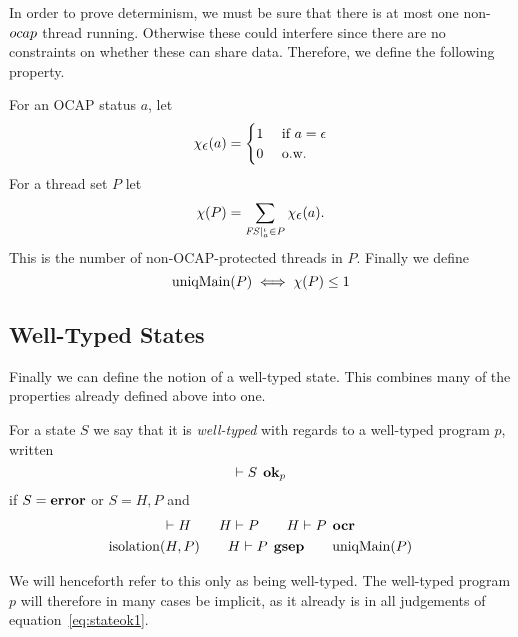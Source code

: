 In order to prove determinism, we must be sure that there is at most one
non-$\mbox{$ocap$}$ thread running. Otherwise these could interfere since there are no
constraints on whether these can share data. Therefore, we define the following
property.
\begin{definition}
  For an OCAP status $a$, let
  \begin{equation*}
    \chi_{\mbox{$\epsilon$}}(a) =
    \begin{cases}
      1 & \text{ if } a = \mbox{$\epsilon$} \\
      0 & \text{ o.w. }
    \end{cases}
  \end{equation*}
  For a thread set $P$ let
  \begin{equation*}
    \chi(P) = \sum_{\mathit{FS}|_a^\iota \in P} \chi_{\mbox{$\epsilon$}}(a).
  \end{equation*}
  This is the number of non-OCAP-protected threads in $P$. Finally we define
  \begin{equation*}
    \mbox{$\mathrm{uniqMain}$}(P) \iff \chi(P) \leq 1
  \end{equation*}
\end{definition}


\subsection{Well-Typed States}%
\label{sub:well_typed_states}

Finally we can define the notion of a well-typed state. This combines many of
the properties already defined above into one.
\begin{definition}
  For a state $S$ we say that it is \emph{well-typed} with regards to a well-typed
  program $p$, written
  \begin{equation*}
    \vdash S \:\: \mbox{{\bf ok}$_p$}
  \end{equation*}
  if $S = \mbox{{\bf error}}$ or $S = H, P$ and
  \begin{equation} \label{eq:stateok1}
    \begin{gathered}
      \vdash H \quad\quad H \vdash P \quad\quad H \vdash P \:\: \mbox{\bf ocr} \\
      \mbox{$\mathrm{isolation}$}{(H, P)} \quad\quad H \vdash P \:\: \mbox{\bf gsep} \quad\quad \mbox{$\mathrm{uniqMain}$}(P)
    \end{gathered}
  \end{equation}
\end{definition}

\begin{remark}
  We will henceforth refer to this only as being well-typed. The well-typed
  program $p$ will therefore in many cases be implicit, as it already is in all
  judgements of equation~\eqref{eq:stateok1}.
\end{remark}

